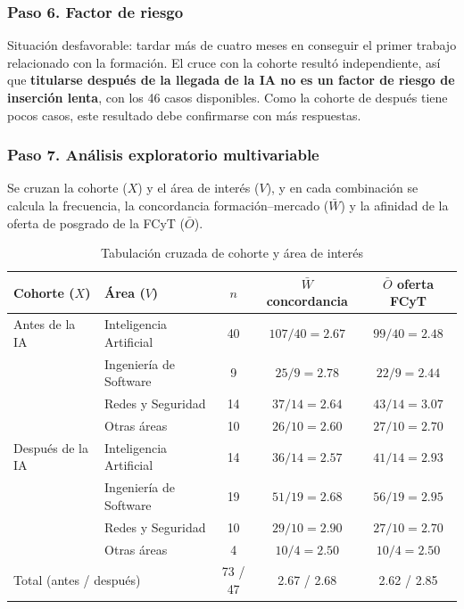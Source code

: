 \documentclass[12pt, a4paper]{article}
\newenvironment{mitabla}[2][H]{%
  \begin{table}[#1]
  \centering
  \caption{#2}
  \small
}{%
  \end{table}
}
\begin{document}
\subsubsection{Paso 6. Factor de riesgo}

Situación desfavorable: tardar más de cuatro meses en conseguir el primer
trabajo relacionado con la formación. El cruce con la cohorte resultó
independiente, así que \textbf{titularse después de la llegada de la IA
no es un factor de riesgo de inserción lenta}, con los 46 casos
disponibles. Como la cohorte de después tiene pocos casos, este resultado
debe confirmarse con más respuestas.

\subsubsection{Paso 7. Análisis exploratorio multivariable}

Se cruzan la cohorte ($X$) y el área de interés ($V$), y en cada
combinación se calcula la frecuencia, la concordancia formación--mercado
($\bar{W}$) y la afinidad de la oferta de posgrado de la FCyT ($\bar{O}$).

\begin{mitabla}{Tabulación cruzada de cohorte y área de interés}\label{tab:a4-multi}
\begin{tabular}{llccc}
\toprule
\textbf{Cohorte ($X$)} & \textbf{Área ($V$)} & \textbf{$n$} & \textbf{$\bar{W}$ concordancia} & \textbf{$\bar{O}$ oferta FCyT} \\
\midrule
Antes de la IA & Inteligencia Artificial & 40 & $107/40 = 2.67$ & $99/40 = 2.48$ \\
 & Ingeniería de Software & 9 & $25/9 = 2.78$ & $22/9 = 2.44$ \\
 & Redes y Seguridad & 14 & $37/14 = 2.64$ & $43/14 = 3.07$ \\
 & Otras áreas & 10 & $26/10 = 2.60$ & $27/10 = 2.70$ \\
Después de la IA & Inteligencia Artificial & 14 & $36/14 = 2.57$ & $41/14 = 2.93$ \\
 & Ingeniería de Software & 19 & $51/19 = 2.68$ & $56/19 = 2.95$ \\
 & Redes y Seguridad & 10 & $29/10 = 2.90$ & $27/10 = 2.70$ \\
 & Otras áreas & 4 & $10/4 = 2.50$ & $10/4 = 2.50$ \\
\midrule
\multicolumn{2}{l}{Total (antes / después)} & 73 / 47 & 2.67 / 2.68 & 2.62 / 2.85 \\
\bottomrule
\end{tabular}
\end{mitabla}
\end{document}
